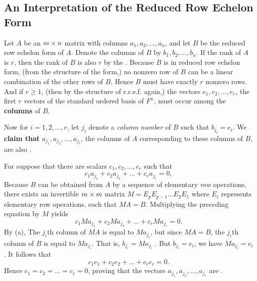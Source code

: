 \subsection{An Interpretation of the Reduced Row Echelon Form}
Let \(A\) be an \(m \times n\) matrix with columns \(a_1, a_2, ..., a_n\), and let \(B\) be the reduced row echelon form of \(A\).
Denote the columns of \(B\) by \(b_1, b_2, ..., b_n\).
If the rank of \(A\) is \(r\), then the rank of \(B\) is also \(r\) by the .
Because \(B\) is in reduced row echelon form, (from the structure of the form,) no nonzero row of \(B\) can be a linear combination of the other rows of \(B\).
Hence \(B\) must have exactly \(r\) nonzero rows.
And if \(r \ge 1\), (then by the structure of r.r.e.f. again,) the vectors \(e_1, e_2, ..., e_r\), the first \(r\) vectors of the standard ordered basis of \(F^n\), must occur among the \textbf{columns} of \(B\).

Now for \(i = 1, 2, ..., r\), let \(j_i\) denote a \emph{column number} of \(B\) such that \(b_{j_i} = e_i\).
We \textbf{claim that} \(a_{j_1}, a_{j_2}, ..., a_{j_r}\), the columns of \(A\) corresponding to these columns of \(B\), are also \LID{}.

For suppose that there are scalars \(c_1, c_2, ..., c_r\) such that
\[
    c_1 a_{j_1} + c_2 a_{j_2} + ... + c_r a_{j_r} = 0,
\]
Because \(B\) can be obtained from \(A\) by a sequence of elementary \emph{row} operations, there exists an invertible \(m \times m\) matrix \(M = E_p E_{p - 1} ... E_2 E_1\) where \(E_i\) represents elementary row operations, such that \(MA = B\).
Multiplying the preceding equation by \(M\) yields
\[
    c_1 M a_{j_1} + c_2 M a_{j_2} + ... + c_r M a_{j_r} = 0.
\]
By (a), The \(j_i\)th column of \(MA\) is equal to \(M a_{j_i}\), but since \(MA = B\), the \(j_i\)th column of \(B\) is equal to \(M a_{j_i}\).
That is, \(b_{j_i} = M a_{j_i}\) .
But \(b_{j_i} = e_i\), we have \(M a_{j_i} = e_i\).
It follows that
\[
    c_1 e_1 + c_2 e_2 + ... + c_r e_r = 0.
\]
Hence \(c_1 = c_2 = ... = c_r = 0\), proving that the vectors \(a_{j_1}, a_{j_2}, ..., a_{j_r}\) are \LID{}.

